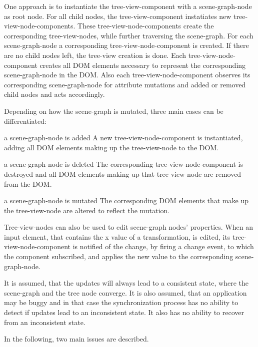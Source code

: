 One approach is to instantiate the tree-view-component with a
scene-graph-node as root node. For all child nodes, the tree-view-component
instatiates new tree-view-node-components. These tree-view-node-components
create the corresponding tree-view-nodes, while further traversing the
scene-graph. For each scene-graph-node a corresponding tree-view-node-component
is created. If there are no child nodes left, the tree-view creation is done.
Each tree-view-node-component creates all \gls{DOM} elements necessary to represent
the corresponding scene-graph-node in the \gls{DOM}. Also each
tree-view-node-component observes its corresponding scene-graph-node for
attribute mutations and added or removed child nodes and acts accordingly.

Depending on how the scene-graph is mutated, three main cases can be differentiated:

\begin{description*}
  \item[a scene-graph-node is added]
    A new tree-view-node-component is instantiated, adding all \gls{DOM} elements making up the tree-view-node to the \gls{DOM}.
  \item[a scene-graph-node is deleted]
    The corresponding tree-view-node-compo\-nent is destroyed and all \gls{DOM} elements making up that tree-view-node are removed from the \gls{DOM}.
  \item[a scene-graph-node is mutated]
    The corresponding \gls{DOM} elements that make up the  tree-view-node are altered to reflect the mutation.
\end{description*}

Tree-view-nodes can also be used to edit scene-graph nodes' properties. When an
input element, that contains the x value of a transformation, is edited, its
tree-view-node-component is notified of the change, by firing a change event, to
which the component subscribed, and applies the new value to the corresponding
scene-graph-node.

It is assumed, that the updates will always lead to a consistent state, where the
scene-graph and the tree node converge. It is also assumed, that an application
may be buggy and in that case the synchronization process has no ability to
detect if updates lead to an inconsistent state. It also has no ability to
recover from an inconsistent state.

In the following, two main issues are described.

